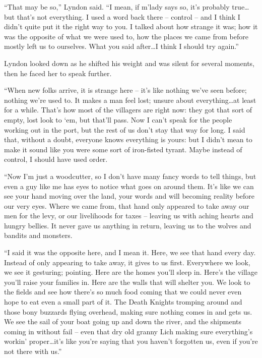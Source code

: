  

“That may be so,” Lyndon said. “I mean, if m’lady says so, it’s probably true…but that’s not everything. I used a word back there – control – and I think I didn’t quite put it the right way to you. I talked about how strange it was; how it was the opposite of what we were used to, how the places we came from before mostly left us to ourselves. What you said after…I think I should try again.”

 

Lyndon looked down as he shifted his weight and was silent for several moments, then he faced her to speak further.

 

“When new folks arrive, it is strange here – it’s like nothing we’ve seen before; nothing we’re used to. It makes a man feel lost; unsure about everything…at least for a while. That’s how most of the villagers are right now: they got that sort of empty, lost look to ‘em, but that’ll pass. Now I can’t speak for the people working out in the port, but the rest of us don’t stay that way for long. I said that, without a doubt, everyone knows everything is yours: but I didn’t mean to make it sound like you were some sort of iron-fisted tyrant. Maybe instead of control, I should have used order.

 

“Now I’m just a woodcutter, so I don’t have many fancy words to tell things, but even a guy like me has eyes to notice what goes on around them. It’s like we can see your hand moving over the land, your words and will becoming reality before our very eyes. Where we came from, that hand only appeared to take away our men for the levy, or our livelihoods for taxes – leaving us with aching hearts and hungry bellies. It never gave us anything in return, leaving us to the wolves and bandits and monsters.

 

“I said it was the opposite here, and I mean it. Here, we see that hand every day. Instead of only appearing to take away, it gives to us first. Everywhere we look, we see it gesturing; pointing. Here are the homes you’ll sleep in. Here’s the village you’ll raise your families in. Here are the walls that will shelter you. We look to the fields and see how there’s so much food coming that we could never even hope to eat even a small part of it. The Death Knights tromping around and those bony buzzards flying overhead, making sure nothing comes in and gets us. We see the sail of your boat going up and down the river, and the shipments coming in without fail – even that dry old granny Lich making sure everything’s workin’ proper…it’s like you’re saying that you haven’t forgotten us, even if you’re not there with us.”

